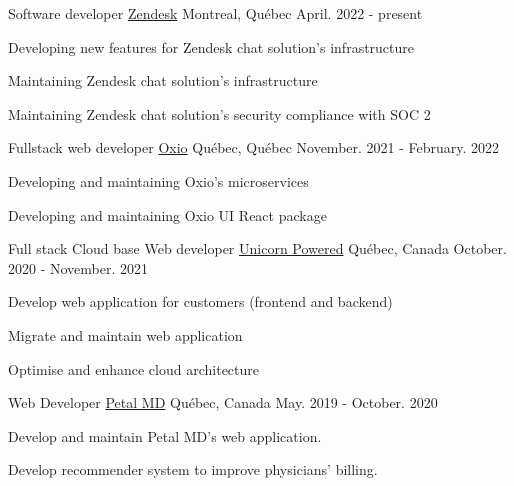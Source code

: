 


\begin{cventries}


\cventry
{Software developer} %
{\href{https://www.zendesk.com}{Zendesk}} %
{Montreal, Québec} %
{April. 2022 - present} %
{ %
\begin{cvitems}
\item {Developing new features for Zendesk chat solution's infrastructure}
\item {Maintaining Zendesk chat solution's infrastructure}
\item {Maintaining Zendesk chat solution's security compliance with SOC 2}
\end{cvitems}
}

\cventry
{Fullstack web developer} %
{\href{https://www.oxio.ca}{Oxio}} %
{Québec, Québec} %
{November. 2021 - February. 2022} %
{ %
\begin{cvitems}
\item {Developing and maintaining Oxio's microservices}
\item {Developing and maintaining Oxio UI React package}
\end{cvitems}
}

\cventry
{Full stack Cloud base Web developer} %
{\href{https://unicornpowered.com/fr/}{Unicorn Powered}} %
{Québec, Canada} %
{October. 2020 - November. 2021} %
{ %
\begin{cvitems}
\item {Develop web application for customers (frontend and backend)}
\item {Migrate and maintain web application}
\item {Optimise and enhance cloud architecture }
\end{cvitems}
}

\cventry
{Web Developer} %
{\href{https://www.petalmd.com/}{Petal MD}} %
{Québec, Canada} %
{May. 2019 - October. 2020} %
{ %
\begin{cvitems}
\item {Develop and maintain Petal MD's web application.}
\item {Develop recommender system to improve physicians' billing.}
\end{cvitems}
}\textbf{}







\end{cventries}
